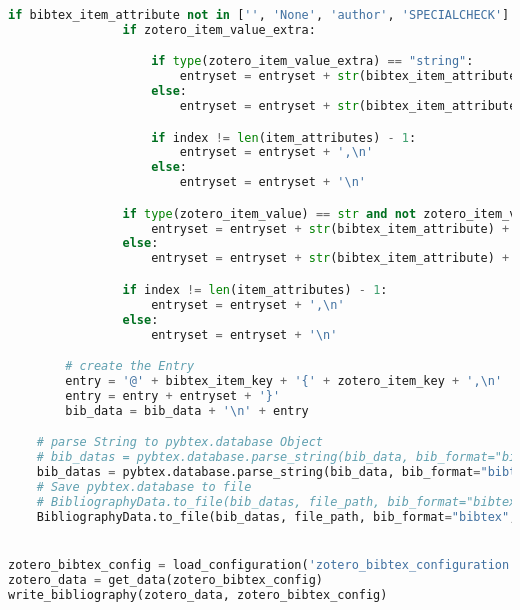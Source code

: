 \begin{lstlisting}[language=python, caption=Python LaTex - zotero.py - Zotero BibLaTex Importer,captionpos=b,label={lst:zotero},breaklines=true]
            if bibtex_item_attribute not in ['', 'None', 'author', 'SPECIALCHECK'] and zotero_item_value not in ['', None, []]:
                if zotero_item_value_extra:

                    if type(zotero_item_value_extra) == "string":
                        entryset = entryset + str(bibtex_item_attribute_extra) + '=\"' + str(zotero_item_value_extra) + '\"'
                    else:
                        entryset = entryset + str(bibtex_item_attribute_extra) + '=' + str(zotero_item_value_extra)

                    if index != len(item_attributes) - 1:
                        entryset = entryset + ',\n'
                    else:
                        entryset = entryset + '\n'

                if type(zotero_item_value) == str and not zotero_item_value.isnumeric():
                    entryset = entryset + str(bibtex_item_attribute) + '=\"' + str(zotero_item_value) + '\"'
                else:
                    entryset = entryset + str(bibtex_item_attribute) + '=' + str(zotero_item_value)

                if index != len(item_attributes) - 1:
                    entryset = entryset + ',\n'
                else:
                    entryset = entryset + '\n'

        # create the Entry
        entry = '@' + bibtex_item_key + '{' + zotero_item_key + ',\n'
        entry = entry + entryset + '}'
        bib_data = bib_data + '\n' + entry

    # parse String to pybtex.database Object
    # bib_datas = pybtex.database.parse_string(bib_data, bib_format="bibtex", encoding='ISO-8859-1')
    bib_datas = pybtex.database.parse_string(bib_data, bib_format="bibtex", encoding='Iutf-8')
    # Save pybtex.database to file
    # BibliographyData.to_file(bib_datas, file_path, bib_format="bibtex", encoding='ISO-8859-1')
    BibliographyData.to_file(bib_datas, file_path, bib_format="bibtex", encoding='utf-8')


zotero_bibtex_config = load_configuration('zotero_bibtex_configuration.yaml')
zotero_data = get_data(zotero_bibtex_config)
write_bibliography(zotero_data, zotero_bibtex_config)
\end{lstlisting}